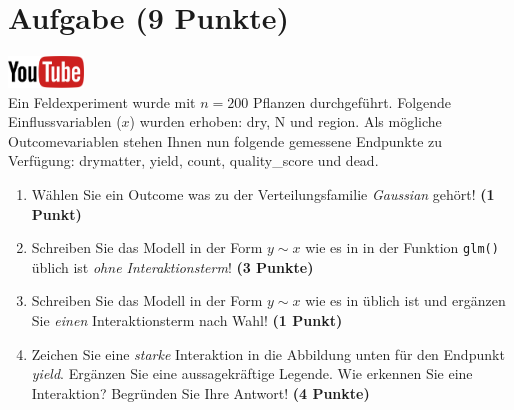 \documentclass[a4paper, 9pt]{scrartcl}\usepackage[]{graphicx}\usepackage[]{xcolor}
\begin{document}
\section{Aufgabe \hfill (9 Punkte)}

\hfill\href{https://youtu.be/AwQEcQWLFCw}{\includegraphics[width =
  2cm]{img/youtube}}\\[1Ex]



Ein Feldexperiment wurde mit $n = 200$ Pflanzen durchgef{\"u}hrt. Folgende
Einflussvariablen ($x$) wurden erhoben: dry, N und region. Als m{\"o}gliche Outcomevariablen stehen Ihnen nun
folgende gemessene Endpunkte zu Verf{\"u}gung: drymatter, yield, count, quality\_score und dead.

\begin{enumerate}
\item W{\"a}hlen Sie ein Outcome was zu der Verteilungsfamilie
  \textit{Gaussian} geh{\"o}rt! \textbf{(1 Punkt)}
\item Schreiben Sie das Modell in der Form $y \sim x$ wie es in \Rlogo in
  der Funktion \texttt{glm()}
  {\"u}blich ist \textit{ohne Interaktionsterm}! \textbf{(3 Punkte)}
\item Schreiben Sie das Modell in der Form $y \sim x$ wie es in \Rlogo
  {\"u}blich ist und erg{\"a}nzen Sie \textit{einen} Interaktionsterm nach Wahl! \textbf{(1 Punkt)} 
\item Zeichen Sie eine \textit{starke}
  Interaktion in die Abbildung unten f{\"u}r den Endpunkt
  \textit{yield}. Erg{\"a}nzen Sie eine aussagekr{\"a}ftige Legende. Wie erkennen
  Sie eine Interaktion? Begr{\"u}nden Sie Ihre Antwort! \textbf{(4 Punkte)}
\end{enumerate}
\end{document}
